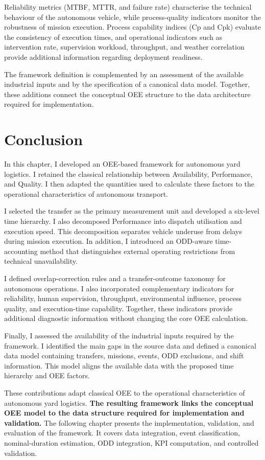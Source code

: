 Reliability metrics (MTBF, MTTR, and failure rate) characterise the technical behaviour of the autonomous vehicle, while process-quality indicators monitor the robustness of mission execution. Process capability indices (Cp and Cpk) evaluate the consistency of execution times, and operational indicators such as intervention rate, supervision workload, throughput, and weather correlation provide additional information regarding deployment readiness.

The framework definition is complemented by an assessment of the available industrial inputs and by the specification of a canonical data model. Together, these additions connect the conceptual OEE structure to the data architecture required for implementation. 

\section{Conclusion}
In this chapter, I developed an OEE-based framework for autonomous yard logistics. I retained the classical relationship between Availability, Performance, and Quality. I then adapted the quantities used to calculate these factors to the operational characteristics of autonomous transport.

I selected the transfer as the primary measurement unit and developed a six-level time hierarchy. I also decomposed Performance into dispatch utilisation and execution speed. This decomposition separates vehicle underuse from delays during mission execution. In addition, I introduced an ODD-aware time-accounting method that distinguishes external operating restrictions from technical unavailability.

I defined overlap-correction rules and a transfer-outcome taxonomy for autonomous operations. I also incorporated complementary indicators for reliability, human supervision, throughput, environmental influence, process quality, and execution-time capability. Together, these indicators provide additional diagnostic information without changing the core OEE calculation.

Finally, I assessed the availability of the industrial inputs required by the framework. I identified the main gaps in the source data and defined a canonical data model containing transfers, missions, events, ODD exclusions, and shift information. This model aligns the available data with the proposed time hierarchy and OEE factors.

These contributions adapt classical OEE to the operational characteristics of autonomous yard logistics. \textbf{The resulting framework links the conceptual OEE model to the data structure required for implementation and validation.} The following chapter presents the implementation, validation, and evaluation of the framework. It covers data integration, event classification, nominal-duration estimation, ODD integration, KPI computation, and controlled validation.
